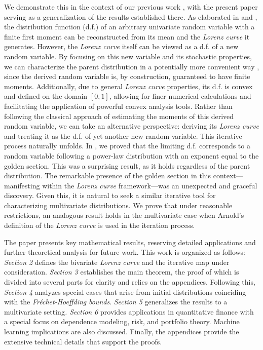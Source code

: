 \documentclass[onecolumn]{article}
\begin{document}
We demonstrate this in the context of our previous work \cite{[3]}, with the
present paper serving as a generalization of the results established there.
As elaborated in \cite{[14]} and \cite{[4]}, the distribution function
(d.f.) of an arbitrary univariate random variable with a finite first moment
can be reconstructed from its mean and the \textit{Lorenz curve} it
generates. However, the \textit{Lorenz curve} itself can be viewed as a d.f.
of a new random variable. By focusing on this new variable and its
stochastic properties, we can characterize the parent distribution in a
potentially more convenient way \cite{[4]}, since the derived random
variable is, by construction, guaranteed to have finite moments.
Additionally, due to general \textit{Lorenz curve} properties, its d.f. is
convex and defined on the domain $[0,1]$, allowing for finer numerical
calculations and facilitating the application of powerful convex analysis
tools. Rather than following the classical approach of estimating the
moments of this derived random variable, we can take an alternative
perspective: deriving its \textit{Lorenz curve} and treating it as the d.f.
of yet another new random variable. This iterative process naturally
unfolds. In \cite{[3]}, we proved that the limiting d.f. corresponds to a
random variable following a power-law distribution with an exponent equal to
the golden section. This was a surprising result, as it holds regardless of
the parent distribution. The remarkable presence of the golden section in
this context---manifesting within the \textit{Lorenz curve} framework---was
an unexpected and graceful discovery. Given this, it is natural to seek a
similar iterative tool for characterizing multivariate distributions. We
prove that under reasonable restrictions, an analogous result holds in the
multivariate case when Arnold's definition of the \textit{Lorenz curve} is
used in the iteration process.

The paper presents key mathematical results, reserving detailed applications
and further theoretical analysis for future work. This work is organized as
follows: \textit{Section 2} defines the bivariate \textit{Lorenz curve} and
the iterative map under consideration. \textit{Section 3} establishes the
main theorem, the proof of which is divided into several parts for clarity
and relies on the appendices. Following this, \textit{Section 4} analyzes
special cases that arise from initial distributions coinciding with the 
\textit{Fr\'{e}chet-Hoeffding} \textit{bounds}. \textit{Section 5 }%
generalizes the results to a multivariate setting\textit{. Section 6}
provides applications in quantitative finance with a special focus on
dependence modeling, risk, and portfolio theory. Machine learning
implications are also discussed. Finally, the appendices provide the
extensive technical details that support the proofs.
\end{document}
